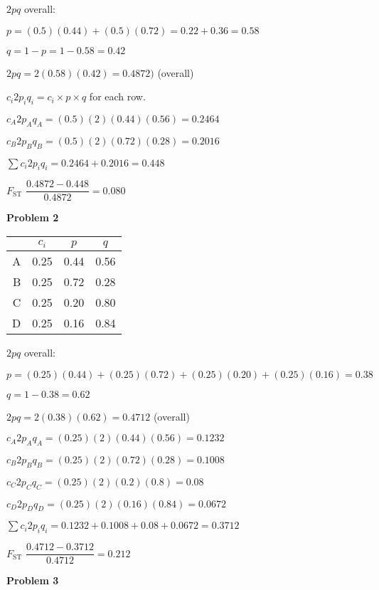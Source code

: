 \documentclass[12pt, addpoints, hidelinks]{exam}
\newcommand{\fst}{$F_{\mathrm{ST}}$}
\begin{document}
\begin{questions}
\begin{multicols}{2}
			$2pq$ overall:

			$p = (0.5)(0.44) + (0.5)(0.72) = 0.22 + 0.36 = 0.58$

			$q = 1 - p = 1 - 0.58 = 0.42$

			$2pq = 2(0.58)(0.42) = 0.4872) $ (overall)

			$c_i2p_iq_i = c_i \times p \times q$ for each row.
			
			$c_A2p_Aq_A = (0.5)(2)(0.44)(0.56) = 0.2464$
			
			$c_B2p_Bq_B = (0.5)(2)(0.72)(0.28) = 0.2016$

			$\sum c_i 2p_iq_i = 0.2464 + 0.2016 = 0.448$ 

			 \fst{} $\dfrac{0.4872 - 0.448}{0.4872} = 0.080$ 

\end{multicols}

\vspace{2\baselineskip}

\begin{multicols}{2}
\textbf{Problem 2}

	\begin{tabular}{rccc}
	\toprule
	& $c_i$ & $p$  & $q$ \tabularnewline
	\midrule
	A & 0.25  & 0.44 & 0.56 \tabularnewline
	B & 0.25  & 0.72 & 0.28 \tabularnewline
	C & 0.25  & 0.20 & 0.80 \tabularnewline
	D & 0.25  & 0.16 & 0.84 \tabularnewline
	\bottomrule
\end{tabular}

			$2pq$ overall:

			$p = (0.25)(0.44) + (0.25)(0.72) + (0.25)(0.20) + (0.25)(0.16) = 0.38$
			
			$q = 1 - 0.38 = 0.62$
			
			$2pq = 2(0.38)(0.62) = 0.4712$ (overall)
			
			$c_A2p_Aq_A = (0.25)(2)(0.44)(0.56) = 0.1232$
			
			$c_B2p_Bq_B = (0.25)(2)(0.72)(0.28) = 0.1008$
			
			$c_C2p_Cq_C = (0.25)(2)(0.2)(0.8) = 0.08$
			
			$c_D2p_Dq_D = (0.25)(2)(0.16)(0.84) = 0.0672$
			
			$\sum c_i 2p_iq_i = 0.1232 + 0.1008 + 0.08 + 0.0672 = 0.3712$
			
			  \fst{} $\dfrac{0.4712 - 0.3712}{0.4712} = 0.212$ 
\end{multicols}

\vspace{2\baselineskip}

\begin{multicols}{2}
\textbf{Problem 3}


\end{multicols}
\end{questions}
\end{document}
